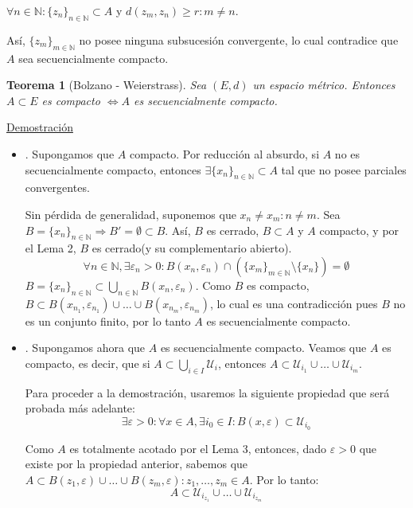 \documentclass[10pt,a4paper,openright]{book}
\theoremstyle{break}
\newtheorem*{theo}{Teorema}
\begin{document}
$\forall n \in \mathbb{N} : \{z_n\}_{n \in \mathbb{N}} \subset A$ y $d(z_m, z_n) \geq r : m \neq n$.

Así, $\{z_m\}_{m \in \mathbb{N}}$ no posee ninguna subsucesión convergente, lo cual contradice que $A$ sea secuencialmente compacto.

\begin{theo}[Bolzano - Weierstrass]
Sea $(E,d)$ un espacio métrico. Entonces $A \subset E$ es compacto $\Leftrightarrow A$ es secuencialmente compacto.
\end{theo}

\underline{Demostración}

\begin{itemize}
\item \fbox{$\Rightarrow$}. Supongamos que $A$ compacto. Por reducción al absurdo, si $A$ no es secuencialmente compacto, entonces $\exists \{x_n\}_{n \in \mathbb{N}} \subset A$ tal que no posee parciales convergentes.

Sin pérdida de generalidad, suponemos que $x_n \neq x_m : n \neq m$. Sea $B = \{x_n\}_{n \in \mathbb{N}} \Rightarrow B' = \emptyset \subset B$. Así, $B$ es cerrado, $B \subset A$ y $A$ compacto, y por el Lema 2, $B$ es cerrado(y su complementario abierto).
$$\forall n \in \mathbb{N}, \exists \varepsilon_n > 0 : B(x_n, \varepsilon_n) \cap \left( \{x_m\}_{m \in \mathbb{N}} \setminus \{x_n\}\right) = \emptyset$$
$B = \{x_n\}_{n \in \mathbb{N}}  \subset \bigcup_{n \in \mathbb{N}} B(x_n, \varepsilon_n)$. Como $B$ es compacto, $B \subset B(x_{n_1}, \varepsilon_{n_1}) \cup \ldots \cup B(x_{n_m}, \varepsilon_{n_m})$, lo cual es una contradicción pues $B$ no es un conjunto finito, por lo tanto $A$ es secuencialmente compacto.

\item \fbox{$\Leftarrow$}. Supongamos ahora que $A$ es secuencialmente compacto. Veamos que $A$ es compacto, es decir, que si $A \subset \bigcup_{i \in I} \mathcal{U}_i$, entonces $A \subset \mathcal{U}_{i_1} \cup \ldots \cup  \mathcal{U}_{i_m}$.

Para proceder a la demostración, usaremos la siguiente propiedad que será probada más adelante:
$$ \exists \varepsilon > 0 : \forall x \in A, \exists i_0 \in I : B(x, \varepsilon) \subset \mathcal{U}_{i_0}$$

Como $A$ es totalmente acotado por el Lema 3, entonces, dado $\varepsilon > 0$ que existe por la propiedad anterior, sabemos que $A \subset B(z_1, \varepsilon) \cup \ldots \cup B(z_m, \varepsilon) : z_1, \ldots, z_m \in A$. Por lo tanto:
$$A \subset \mathcal{U}_{i_{z_1}} \cup \ldots \cup \mathcal{U}_{i_{z_m}}$$
\end{itemize}
\end{document}
